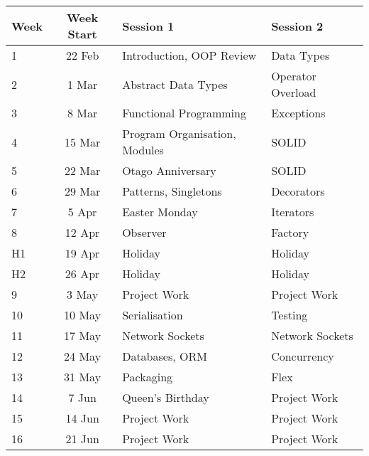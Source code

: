 \documentclass{article}
\begin{document}
\renewcommand{\arraystretch}{1.5}
\begin{tabular}{|l|c|l|l|}
\hline
 Week     & Week Start & Session 1                          & Session 2               \\ \hline
 1        & 22 Feb     & Introduction, OOP Review           & Data Types              \\ \hline
 2        &  1 Mar     & Abstract Data Types                & Operator Overload       \\ \hline
 3        &  8 Mar     & Functional Programming             & Exceptions              \\ \hline
 4        & 15 Mar     & Program Organisation, Modules      & SOLID                   \\ \hline
 5        & 22 Mar     & Otago Anniversary                  & SOLID                   \\ \hline
 6        & 29 Mar     & Patterns, Singletons               & Decorators              \\ \hline
 7        &  5 Apr     & Easter Monday                      & Iterators               \\ \hline
 8        & 12 Apr     & Observer                           & Factory                 \\ \hline
 H1       & 19 Apr     & Holiday                            & Holiday                 \\ \hline
 H2       & 26 Apr     & Holiday                            & Holiday                 \\ \hline
 9        &  3 May     & Project Work                       & Project Work            \\ \hline
 10       & 10 May     & Serialisation                      & Testing                 \\ \hline

 11       & 17 May     & Network Sockets                    & Network Sockets         \\ \hline
 12       & 24 May     & Databases, ORM                     & Concurrency             \\ \hline
 13       & 31 May     & Packaging                          & Flex                    \\ \hline
 14       &  7 Jun     & Queen's Birthday                   & Project Work            \\ \hline
 15       & 14 Jun     & Project Work                       & Project Work            \\ \hline
 16       & 21 Jun     & Project Work                       & Project Work            \\ \hline
\end{tabular}
\end{document}
